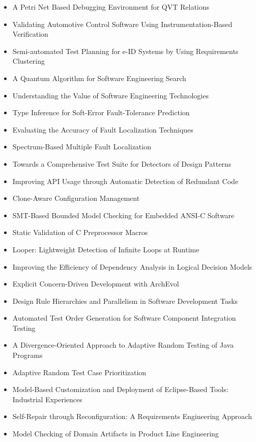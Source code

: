 {\small
\begin{itemize}[itemsep=-1ex]
  \item A Petri Net Based Debugging Environment for QVT Relations
  \item Validating Automotive Control Software Using Instrumentation-Based Verification
  \item Semi-automated Test Planning for e-ID Systems by Using Requirements Clustering
  \item A Quantum Algorithm for Software Engineering Search
  \item Understanding the Value of Software Engineering Technologies
  \item Type Inference for Soft-Error Fault-Tolerance Prediction
  \item Evaluating the Accuracy of Fault Localization Techniques
  \item Spectrum-Based Multiple Fault Localization
  \item Towards a Comprehensive Test Suite for Detectors of Design Patterns
  \item Improving API Usage through Automatic Detection of Redundant Code
  \item Clone-Aware Configuration Management
  \item SMT-Based Bounded Model Checking for Embedded ANSI-C Software
  \item Static Validation of C Preprocessor Macros
  \item Looper: Lightweight Detection of Infinite Loops at Runtime
  \item Improving the Efficiency of Dependency Analysis in Logical Decision Models
  \item Explicit Concern-Driven Development with ArchEvol
  \item Design Rule Hierarchies and Parallelism in Software Development Tasks
  \item Automated Test Order Generation for Software Component Integration Testing
  \item A Divergence-Oriented Approach to Adaptive Random Testing of Java Programs
  \item Adaptive Random Test Case Prioritization
  \item Model-Based Customization and Deployment of Eclipse-Based Tools: Industrial Experiences
  \item Self-Repair through Reconfiguration: A Requirements Engineering Approach
  \item Model Checking of Domain Artifacts in Product Line Engineering

\end{itemize}}
